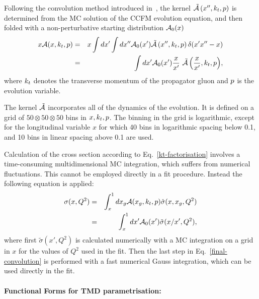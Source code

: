 Following the  convolution method introduced in~\cite{Jung:2012hy,Hautmann:2013tba}, the 
kernel $ \tilde {\cal A}\left(x'',\kt,\Pmax\right) $ is determined from the MC  solution of the CCFM evolution equation, 
and then folded with a non-perturbative starting distribution ${\cal A}_0 (x)$
{ 
\begin{eqnarray}
x {\cal A}(x,\kt,\Pmax) &= &x\int dx' \int dx'' {\cal A}_0 (x') \tilde{\cal A}\left(x'',\kt,\Pmax\right) 
 \delta(x' 
x'' - x) 
\nonumber  
\\
& = & \int dx' {{\cal A}_0 (x') }  
\frac{x}{x'} \ { \tilde{\cal A}\left(\frac{x}{x'},\kt,\Pmax\right) }, 
\end{eqnarray}
}
where $k_t$ denotes the transverse momentum of the propagator gluon and $p$ is the 
evolution variable.

The kernel $\tilde{\cal A}$ incorporates all of  the dynamics of the evolution.  
It is defined on a grid of $50\otimes50\otimes50$ bins in $ x, k_t, p$.  
The binning in the grid is logarithmic, except for the longitudinal variable 
$x$ for which 40 bins in logarithmic 
spacing below 0.1, and 10 bins in linear spacing above 0.1 are used.

Calculation of the cross section according to Eq.~\ref{kt-factorisation} involves a time-consuming
multidimensional MC integration, which suffers from numerical fluctuations.  
This cannot be employed directly in a fit procedure. Instead the following equation is applied:
\begin{eqnarray}
\sigma(x,Q^2) & = & \int_x^1 d x_g {\cal A}(x_g,\kt,\Pmax) \hat{ \sigma}(x,x_g,Q^2) 
\nonumber\\
  & = & \int_x^1 dx' {\cal A}_0 (x')  \tilde{ \sigma}(x/x',Q^2),
    \label{final-convolution}
 \end{eqnarray}
where first $ \tilde{ \sigma}(x',Q^2)$ is calculated numerically with a MC integration 
on a grid in $x$ for the values of $Q^2$ used in the fit. Then the last step in Eq.~\ref{final-convolution}  
is performed with a fast numerical Gauss integration, which can be used directly in the fit.

\paragraph{Functional Forms for TMD parametrisation:} \rm

